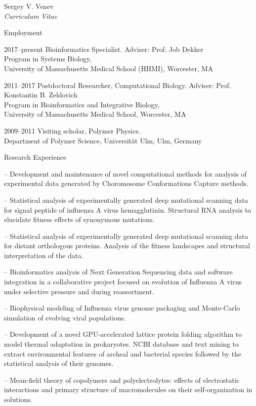 \documentclass[10pt]{article}
\begin{document}
\begin{cv}{Sergey V. Venev\\{\large \itshape Curriculum Vitae}}
\begin{cvlist}{Employment}
    \item[2017--present] Bioinformatics Specialist. Adviser: Prof. Job Dekker\\
    Program in Systems Biology,\\ University of Massachusetts Medical School (HHMI),
    Worcester, MA   
    \item[2011--2017] Postdoctoral Researcher, Computational Biology. Adviser: Prof. Konstantin B. Zeldovich\\
    Program in Bioinformatics and Integrative Biology,\\ University of Massachusetts Medical School,
    Worcester, MA   
    \item[2009--2011] Visiting scholar, Polymer Physics. \\
    Department of Polymer Science, Universit{\"a}t Ulm,
    Ulm, Germany  
\end{cvlist}



\setlength{\oldcvlabelwidth}{\cvlabelwidth}
\setlength{\cvlabelwidth}{1em}
\begin{cvlist}{Research Experience}
    \item[--] Development and maintenance of novel computational methods for analysis of experimental data generated by Choromosome Conformations Capture methods.
    \item[--] Statistical analysis of experimentally generated deep mutational scanning data for signal peptide of influenza A virus hemagglutinin. Structural RNA analysis to elucidate fitness effects of synonymous mutations.
    \item[--] Statistical analysis of experimentally generated deep mutational scanning data for distant orthologous proteins. Analysis of the fitness landscapes and structural interpretation of the data.
    \item[--] Bioinformatics analysis of Next Generation Sequencing data and software integration in a collaborative project focused on evolution of Influenza A virus under selective pressure and during reassortment.
    \item[--] Biophysical modeling of Influenza virus genome packaging and Monte-Carlo simulation of evolving viral populations.
    \item[--] Development of a novel GPU-accelerated lattice protein folding algorithm to model thermal adaptation in prokaryotes. NCBI database and text mining to extract environmental features of archeal and bacterial species followed by the statistical analysis of their genomes.
    \item[--] Mean-field theory of copolymers and polyelectrolytes: effects of electrostatic interactions and primary structure of macromolecules on their self-organization in solutions.


\end{cvlist}
\end{cv}
\end{document}
